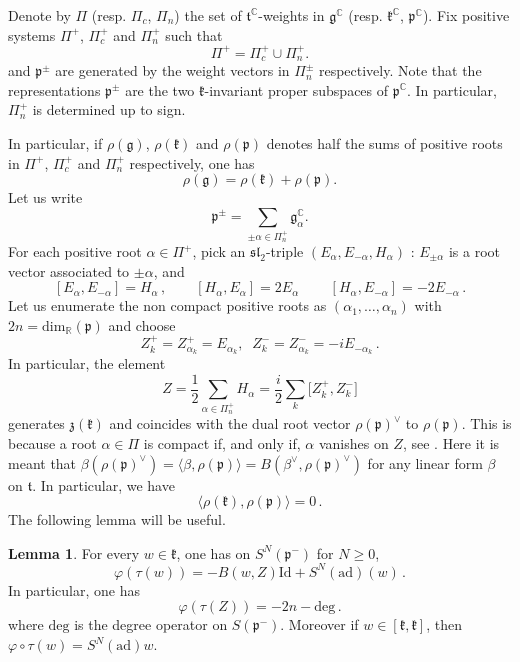 \documentclass{amsart}[draft,11pt]
\newcommand{\fg}{{\mathfrak{g}}}
\newcommand{\fk}{{\mathfrak{k}}}
\newcommand{\fp}{{\mathfrak{p}}}
\newcommand{\CC}{{\mathbb{C}}}
\newcommand{\RR}{{\mathbb{R}}}
\newcommand{\ad}{{\mathrm{ad}}}
\numberwithin{equation}{section}
\theoremstyle{definition}
\newtheorem{lem}[theorem]{Lemma}
\begin{document}
Denote by $\Pi$ (resp. $\Pi_c$, $\Pi_n$) the set of ${\mathfrak t}^\CC$-weights in $\fg^\CC$ (resp. $\fk^\CC$, $\fp^\CC$). Fix positive systems $\Pi^+$, $\Pi_c^+$ and $\Pi_n^+$ such that 
\[
\Pi^+=\Pi_c^+\cup\Pi_n^+.
\]
and $\fp^\pm$ are generated by the weight vectors
in $\Pi^\pm_n$ respectively. Note that the representations $\fp^
\pm$ are the two $\fk$-invariant proper subspaces of $\fp^\mathbb{C}$. In particular, $\Pi^+_n$ is determined up to sign.

In particular, if $\rho(\fg)$, $\rho(\fk)$ and $\rho(\fp)$ denotes half the sums of positive roots in $\Pi^+$, $\Pi_c^+$ and $\Pi_n^+$ respectively, one has
\begin{equation}\label{rhos}
\rho(\fg)=\rho(\fk)+\rho(\fp).
\end{equation}
Let us write
% 
\begin{equation}\label{p+-}
\fp^\pm=\sum_{\pm\alpha\in\Pi^+_n}\fg_\alpha^\mathbb{C}.
\end{equation}
For each positive root $\alpha\in\Pi^+$, pick an $\mathfrak{sl}_2$-triple $(E_\alpha,E_{-\alpha},H_\alpha)$ : $E_{\pm\alpha}$ is a root 
vector associated to $\pm\alpha$, and
$$
[E_\alpha,E_{-\alpha}]= H_\alpha\,,\qquad
[H_\alpha,E_\alpha]=2E_\alpha \,\qquad
[H_\alpha,E_{-\alpha}]=-2E_{-\alpha}\,.
$$
Let us enumerate the non compact positive roots as 
$(\alpha_1,\ldots,\alpha_n)$ with $2n=\mathrm{dim}_\RR(\fp)$ and choose
\begin{equation}\label{rootbasis}
Z_{k}^+=Z_{\alpha_k}^+=E_{\alpha_k},\;\;Z_k^-=Z_{\alpha_k}^-=-iE_{-\alpha_k}\,.
\end{equation}
In particular, the element 
\begin{equation}\label{zgenerator}
Z=\frac{1}{2}\sum_{\alpha \in \Pi_n^+} H_\alpha =\frac{i}{2}\sum_k\lbrack Z_k^+,Z_k^-\rbrack
\end{equation}
generates $\mathfrak{z}(\fk)$ and coincides with the dual root vector $\rho(\fp)^\vee$ to $\rho(\fp)$. This is because a root $\alpha\in\Pi$ is compact if, and only if, $\alpha$ vanishes on $Z$, see \cite[Lemma 7.127]{Kn}. Here it is meant that $\beta(\rho(\fp)^\vee)=\langle\beta,\rho(\fp)\rangle = B(\beta^\vee,\rho(\fp)^\vee)$ for any linear form $\beta$ on ${\mathfrak t}$. 
In particular, we have 
\begin{equation}
\label{rho_perp}
    \langle \rho(\fk),\rho(\fp)\rangle=0\,.
\end{equation}
The following lemma will be useful. 
\begin{lem}\label{lemalpha} For every $w\in\fk$, one has on $S^N(\fp^-)$ for $N\geq 0$,
$$
\varphi(\tau(w))=-B(w,Z)
\mathrm{Id}+S^N(\ad)(w)\,.
$$
In particular, one has
$$
\varphi(\tau(Z))=-2n-\mathrm{deg}\,.
$$
where $\mathrm{deg}$ is the degree operator on
$S(\fp^-)$. Moreover if $w\in[\fk,\fk]$, then $\varphi \circ \tau (w) = S^N(\mathrm{ad})w$.
\end{lem}
\end{document}

